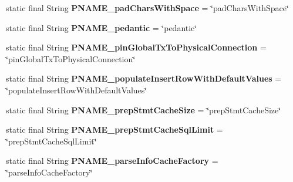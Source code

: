 \begin{DoxyCompactItemize}
\item 
\mbox{\label{classcom_1_1mysql_1_1cj_1_1conf_1_1_property_definitions_a5d2ad9e905e4d9cfceddf9b8bbad59bf}} 
static final String {\bfseries P\+N\+A\+M\+E\+\_\+pad\+Chars\+With\+Space} = \char`\"{}pad\+Chars\+With\+Space\char`\"{}
\item 
\mbox{\label{classcom_1_1mysql_1_1cj_1_1conf_1_1_property_definitions_a61a6d7faf744b5ac75499acf83033f48}} 
static final String {\bfseries P\+N\+A\+M\+E\+\_\+pedantic} = \char`\"{}pedantic\char`\"{}
\item 
\mbox{\label{classcom_1_1mysql_1_1cj_1_1conf_1_1_property_definitions_ad3d84250f5b94fba3d991d8e5497061e}} 
static final String {\bfseries P\+N\+A\+M\+E\+\_\+pin\+Global\+Tx\+To\+Physical\+Connection} = \char`\"{}pin\+Global\+Tx\+To\+Physical\+Connection\char`\"{}
\item 
\mbox{\label{classcom_1_1mysql_1_1cj_1_1conf_1_1_property_definitions_a63bd5be16794a50102559fef49335d3f}} 
static final String {\bfseries P\+N\+A\+M\+E\+\_\+populate\+Insert\+Row\+With\+Default\+Values} = \char`\"{}populate\+Insert\+Row\+With\+Default\+Values\char`\"{}
\item 
\mbox{\label{classcom_1_1mysql_1_1cj_1_1conf_1_1_property_definitions_ae5ec822a1f02663ce50bda8566ab4679}} 
static final String {\bfseries P\+N\+A\+M\+E\+\_\+prep\+Stmt\+Cache\+Size} = \char`\"{}prep\+Stmt\+Cache\+Size\char`\"{}
\item 
\mbox{\label{classcom_1_1mysql_1_1cj_1_1conf_1_1_property_definitions_af893879da8fef114dde75454023e5eb2}} 
static final String {\bfseries P\+N\+A\+M\+E\+\_\+prep\+Stmt\+Cache\+Sql\+Limit} = \char`\"{}prep\+Stmt\+Cache\+Sql\+Limit\char`\"{}
\item 
\mbox{\label{classcom_1_1mysql_1_1cj_1_1conf_1_1_property_definitions_ab859c14699bf98d6f14f09c81cd1c282}} 
static final String {\bfseries P\+N\+A\+M\+E\+\_\+parse\+Info\+Cache\+Factory} = \char`\"{}parse\+Info\+Cache\+Factory\char`\"{}

\end{DoxyCompactItemize}
